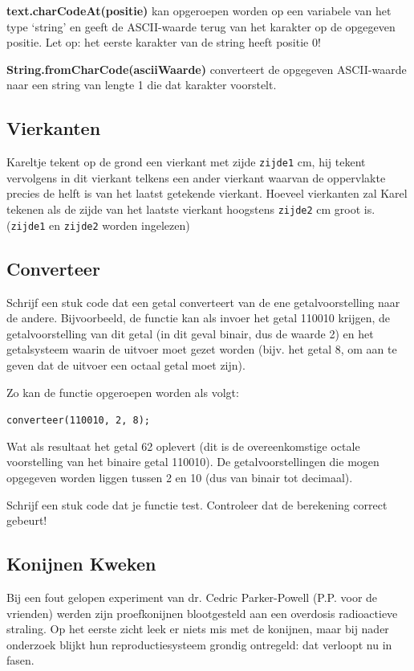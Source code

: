 \textbf{text.charCodeAt(positie)} kan opgeroepen worden op een variabele van het type `string' en geeft de ASCII-waarde terug van het karakter op de opgegeven positie. Let op: het eerste karakter van de string heeft positie 0!

\textbf{String.fromCharCode(asciiWaarde)} converteert de opgegeven ASCII-waarde naar een string van lengte 1 die dat karakter voorstelt.

\subsection{Vierkanten}

Kareltje tekent op de grond een vierkant met zijde \texttt{zijde1} cm, hij tekent vervolgens in dit vierkant telkens een ander vierkant waarvan de oppervlakte precies de helft is van het laatst getekende vierkant. Hoeveel vierkanten zal Karel tekenen als de zijde van het laatste vierkant hoogstens \texttt{zijde2} cm groot is. (\texttt{zijde1} en \texttt{zijde2} worden ingelezen)

\subsection{Converteer}

Schrijf een stuk code dat een getal converteert van de ene getalvoorstelling naar de andere. Bijvoorbeeld, de functie kan als invoer het getal 110010 krijgen, de getalvoorstelling van dit getal (in dit geval binair, dus de waarde 2) en het getalsysteem waarin de uitvoer moet gezet worden (bijv. het getal 8, om aan te geven dat de uitvoer een octaal getal moet zijn).

Zo kan de functie opgeroepen worden als volgt:
\begin{center}
\texttt{converteer(110010, 2, 8);}
\end{center}
Wat als resultaat het getal 62 oplevert (dit is de overeenkomstige octale voorstelling van het binaire getal 110010). De getalvoorstellingen die mogen opgegeven worden liggen tussen 2 en 10 (dus van binair tot decimaal).

Schrijf een stuk code dat je functie test. Controleer dat de berekening correct gebeurt!

\subsection{Konijnen Kweken}

Bij een fout gelopen experiment van dr. Cedric Parker-Powell (P.P. voor de vrienden) werden zijn proefkonijnen blootgesteld aan een overdosis radioactieve straling. Op het eerste zicht leek er niets mis met de konijnen, maar bij nader onderzoek blijkt hun reproductiesysteem grondig ontregeld: dat verloopt nu in fasen.

